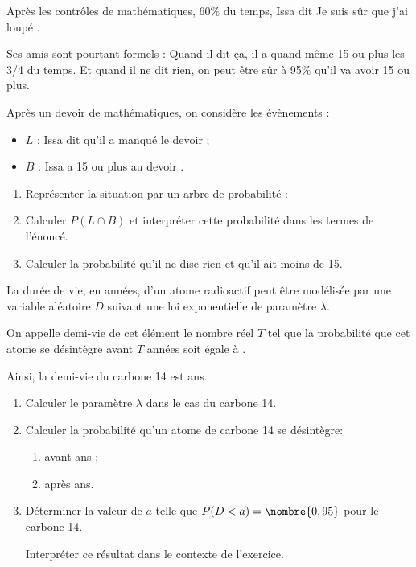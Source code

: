 \begin{question}[topic=probabilités]
  Après les contrôles de mathématiques, 60\% du temps, Issa dit \og Je
  suis sûr que j'ai loupé \fg.

  Ses amis sont pourtant formels : \og Quand il dit ça, il a quand même 15
  ou plus les 3/4 du temps.
  Et quand il ne dit rien, on peut être sûr à 95\% qu'il va avoir 15
  ou plus. \fg

  Après un devoir de mathématiques, on considère les évènements :
  \begin{itemize}
    \item $L$ : \og Issa dit qu'il a manqué le devoir \fg ;
    \item $B$ : \og Issa a 15 ou plus au devoir \fg.
  \end{itemize}
  \vspace{-1\baselineskip}
  \begin{enumerate}
    \item Représenter la situation par un arbre de probabilité :
    \item Calculer $P(L\cap B)$ et interpréter cette probabilité dans les
      termes de l'énoncé.
    \item Calculer la probabilité qu'il ne dise rien et qu'il ait moins de 15.
  \end{enumerate}
\end{question}

\begin{question}[topic=loi_continue]
  La durée de vie, en années, d'un atome radioactif peut être modélisée par
  une variable aléatoire $D$ suivant une loi exponentielle de paramètre
  $\lambda$.

  On appelle demi-vie de cet élément le nombre réel $T$ tel que la
  probabilité que cet atome se désintègre avant $T$ années soit égale à
  .

  Ainsi, la demi-vie du carbone 14 est  ans.
  \begin{enumerate}
    \item Calculer le paramètre $\lambda$ dans le cas du carbone 14.
    \item Calculer la probabilité qu'un atome de carbone 14 se désintègre:
      \begin{enumerate}
      \item avant  ans ;
      \item après  ans.
      \end{enumerate}
    \item Déterminer la valeur de $a$ telle que $P(D<a)=\nombre{0,95}$ pour
      le carbone 14.

      Interpréter ce résultat dans le contexte de l'exercice.
  \end{enumerate}
\end{question}

